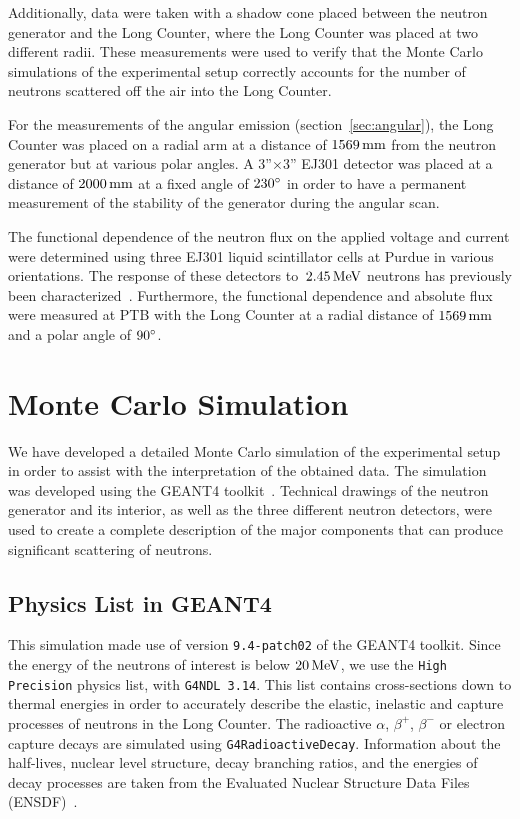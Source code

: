 Additionally, data were taken with a shadow cone placed between the neutron generator and the Long Counter, where the Long Counter was placed at two different radii. These measurements were used to verify that the Monte Carlo simulations of the experimental setup correctly accounts for the number of neutrons scattered off the air into the Long Counter.

For the measurements of the angular emission (section~\ref{sec:angular}), the Long Counter was placed on a radial arm at a distance of $1569\,\mathrm{mm}$ from the neutron generator but at various polar angles. A 3''$\times$3'' EJ301 detector was placed at a distance of $2000\,\mathrm{mm}$ at a fixed angle of $230{}^{\circ}$ in order to have a permanent measurement of the stability of the generator during the angular scan.

The functional dependence of the neutron flux on the applied voltage and current were determined using three EJ301 liquid scintillator cells at Purdue in various orientations. The response of these detectors to~$2.45\,\mathrm{MeV}$ neutrons has previously been characterized~\cite{Lang:2016xks}. Furthermore, the functional dependence and absolute flux were measured at PTB with the Long Counter at a radial distance of $1569\,\mathrm{mm}$ and a polar angle of $90{}^{\circ}$.


\section{Monte Carlo Simulation}

We have developed a detailed Monte Carlo simulation of the experimental setup in order to assist with the interpretation of the obtained data. The simulation was developed using the GEANT4 toolkit~\cite{Geant4}.  Technical drawings of the neutron generator and its interior, as well as the three different neutron detectors, were used to create a complete description of the major components that can produce significant scattering of neutrons.

\subsection{Physics List in GEANT4}

This simulation made use of version \texttt{9.4-patch02} of the GEANT4 toolkit. Since the energy of the neutrons of interest is below $20\,\mathrm{MeV}$, we use the \texttt{High Precision} physics list, with \texttt{G4NDL 3.14}. This list contains cross-sections down to thermal energies in order to accurately describe the elastic, inelastic and capture processes of neutrons in the Long Counter. The radioactive $\alpha$, $\beta^{+}$, $\beta^{-}$ or electron capture decays are simulated using \texttt{G4RadioactiveDecay}. Information about the half-lives, nuclear level structure, decay branching ratios, and the energies of decay processes are taken from the Evaluated Nuclear Structure Data Files (ENSDF)~\cite{Bhat:1992}.

